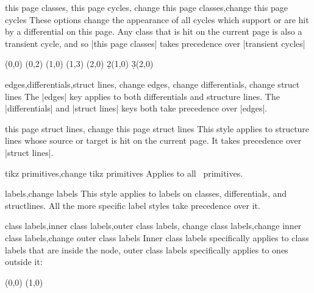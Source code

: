 \begin{sseqdata}[|| name = ex1, cohomological Serre grading]
\begin{stylekeylist}{this page classes, this page cycles, change this page classes,change this page cycles}
These options change the appearance of all cycles which support or are hit by a differential on this page. Any class that is hit on the current page is also a transient cycle, and so |this page classes| takes precedence over |transient cycles|
\begin{codeexample}[width = 6cm]
\begin{sseqdata}[ name = this page cycles example, Adams grading,
                  transient cycles = { red, fill }, this page cycles = { blue } ]
\class(0,0)
\class(0,2) \class(1,0)
\class(1,3) \class(2,0)
\d2(1,0) \d3(2,0)
\end{sseqdata}
\printpage[ name = this page cycles example, page = 2 ] \qquad
\printpage[ name = this page cycles example, page = 3 ]
\end{codeexample}
\end{stylekeylist}

\begin{stylekeylist}{edges,differentials,struct lines, change edges, change differentials, change struct lines}
The |edges| key applies to both differentials and structure lines. The |differentials| and |struct lines| keys both take precedence over |edges|.
\end{stylekeylist}

\begin{stylekeylist}{this page struct lines, change this page struct lines}
This style applies to structure lines whose source or target is hit on the current page. It takes precedence over |struct lines|.
\end{stylekeylist}

\begin{stylekeylist}{tikz primitives,change tikz primitives}
Applies to all \tikzpkg\  primitives.
\end{stylekeylist}


\begin{stylekeylist}{labels,change labels}
This style applies to labels on classes, differentials, and structlines. All the more specific label styles take precedence over it.
\end{stylekeylist}

\begin{stylekeylist}{class labels,inner class labels,outer class labels,
                change class labels,change inner class labels,change outer class labels}
Inner class labels specifically applies to class labels that are inside the node, outer class labels specifically applies to ones outside it:
\begin{codeexample}[]
\begin{sseqpage}[ no axes, classes = { inner sep = 1pt },
    label distance=2pt,
    outer class labels = { red },
    inner class labels = { blue } ]
\class["a", "b" above](0,0)
\class["a", "c" right](1,0)
\end{sseqpage}
\end{codeexample}
\end{stylekeylist}


\end{sseqdata}
